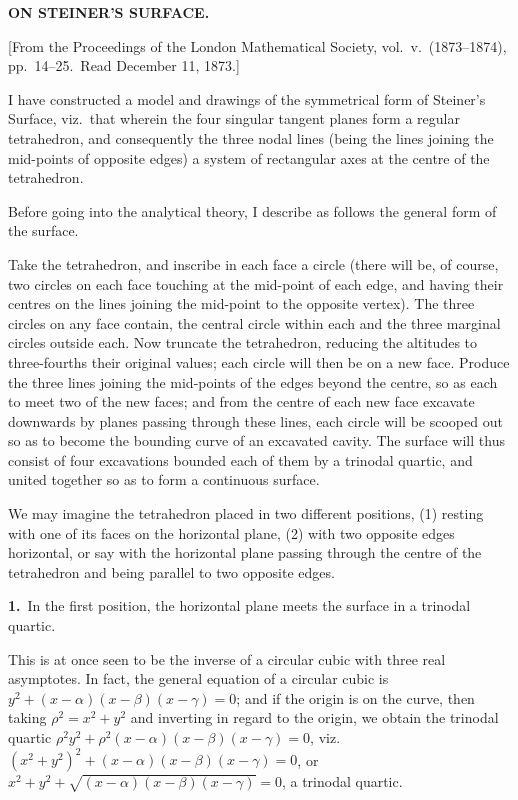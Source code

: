\documentclass[12pt,a4paper]{article}
\theoremstyle{plain}
\theoremstyle{definition}
\begin{document}
\begin{center}
{\large \textbf{ON STEINER'S SURFACE.}}
\end{center}

\begin{flushright}
{\small [From the Proceedings of the London Mathematical Society, vol.\ v.\ (1873--1874), pp.\ 14--25.\ Read December 11, 1873.]}
\end{flushright}

I have constructed a model and drawings of the symmetrical form of Steiner's Surface, viz.\ that wherein the four singular tangent planes form a regular tetrahedron, and consequently the three nodal lines (being the lines joining the mid-points of opposite edges) a system of rectangular axes at the centre of the tetrahedron.

Before going into the analytical theory, I describe as follows the general form of the surface.

Take the tetrahedron, and inscribe in each face a circle (there will be, of course, two circles on each face touching at the mid-point of each edge, and having their centres on the lines joining the mid-point to the opposite vertex). The three circles on any face contain, the central circle within each and the three marginal circles outside each. Now truncate the tetrahedron, reducing the altitudes to three-fourths their original values; each circle will then be on a new face. Produce the three lines joining the mid-points of the edges beyond the centre, so as each to meet two of the new faces; and from the centre of each new face excavate downwards by planes passing through these lines, each circle will be scooped out so as to become the bounding curve of an excavated cavity. The surface will thus consist of four excavations bounded each of them by a trinodal quartic, and united together so as to form a continuous surface.

We may imagine the tetrahedron placed in two different positions, (1) resting with one of its faces on the horizontal plane, (2) with two opposite edges horizontal, or say with the horizontal plane passing through the centre of the tetrahedron and being parallel to two opposite edges.

\textbf{1.}\ In the first position, the horizontal plane meets the surface in a trinodal quartic.

This is at once seen to be the inverse of a circular cubic with three real asymptotes. In fact, the general equation of a circular cubic is $y^2 + (x - \alpha)(x - \beta)(x - \gamma) = 0$; and if the origin is on the curve, then taking $\rho^2 = x^2 + y^2$ and inverting in regard to the origin, we obtain the trinodal quartic $\rho^2 y^2 + \rho^2(x - \alpha)(x - \beta)(x - \gamma) = 0$, viz.\ $(x^2 + y^2)^2 + (x - \alpha)(x - \beta)(x - \gamma) = 0$, or $x^2 + y^2 + \sqrt{(x - \alpha)(x - \beta)(x - \gamma)} = 0$, a trinodal quartic.
\end{document}
